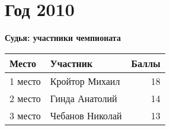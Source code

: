 \chapter{Год 2010}
\textbf{Судья: участники чемпионата}

\begin{tabularx}{\textwidth}{l l r}
Место & Участник & Баллы \\
\hline
1 место & Кройтор Михаил & 18 \\
2 место & Гинда Анатолий & 14 \\
3 место & Чебанов Николай & 13 \\
\end{tabularx}